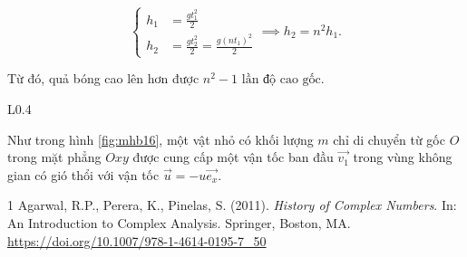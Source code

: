 \documentclass[a4paper, titlepage, openany]{book}
\newcounter{exercise}
\numberwithin{equation}{chapter}
\def \pointSize {2pt}
\begin{document}
\begin{equation*}
   \begin{cases}
      h_1 &= \frac{gt_1^2}{2} \\
      h_2 &= \frac{gt_2^2}{2} = \frac{g\left(nt_1\right)^2}{2}
   \end{cases}
   \implies h_2 = n^2 h_1.
\end{equation*}

Từ đó, quả bóng cao lên hơn được $\boxed{n^2 - 1 \text{ lần độ cao gốc}}$.

\begin{wrapfigure}{L}{0.4\textwidth}
   \centering

   \caption{Hình minh họa cho bài \ref{ex:16}}
   \label{fig:mhb16}
\end{wrapfigure}

\exercise[ex:16] Như trong hình \ref{fig:mhb16}, một vật nhỏ có khối lượng $m$ chỉ di chuyển từ gốc $O$ trong mặt phẳng $Oxy$ được cung cấp một vận tốc ban đầu $\overrightarrow{v_1}$ trong vùng không gian có gió thổi với vận tốc $\vec{u} = -u \overrightarrow{e_x}$.



\begin{thebibliography}{1}
Agarwal, R.P., Perera, K., Pinelas, S. (2011). \textit{History of Complex Numbers}. In: An Introduction to Complex Analysis. Springer, Boston, MA. \url{https://doi.org/10.1007/978-1-4614-0195-7_50}
\end{thebibliography}
\end{document}
